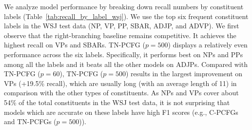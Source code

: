 \documentclass[11pt]{article}
\begin{document}
We analyze model performance by breaking down recall numbers by constituent labels (Table~\ref{tab:recall_by_label_wsj}).
We use the top six frequent constituent labels in the WSJ test data (NP, VP, PP, SBAR, ADJP, and ADVP).
We first observe that the right-branching baseline remains competitive.
It achieves the highest recall on VPs and SBARs.
TN-PCFG ($p=500$) displays a relatively even performance across the six labels.
Specifically, it performs best on NPs and PPs among all the labels and it beats all the other models on ADJPs.
Compared with TN-PCFG ($p=60$),
TN-PCFG ($p=500$) results in the largest improvement on VPs (+19.5\% recall),
which are usually long (with an average length of 11) in comparison with the other types of constituents.
As NPs and VPs cover about 54\% of the total constituents in the WSJ test data,
it is not surprising that models which are accurate on these labels have high F1 scores (e.g., C-PCFGs and TN-PCFGs ($p=500$)). 
\end{document}
